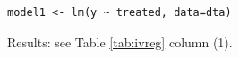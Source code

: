 \documentclass[a4paper]{article}
\begin{document}

\subsection{} %

\begin{verbatim}
model1 <- lm(y ~ treated, data=dta)
\end{verbatim}

Results: see Table \ref{tab:ivreg} column (1).
\end{document}
